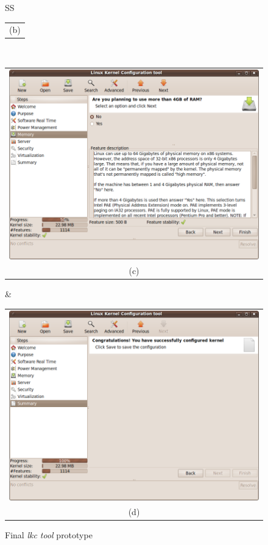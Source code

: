 \documentclass{chi2009}
\begin{document}
\begin{figure}[!t]
\begin{tabular}{SS}
\begin{tabular}{c}
  (b) \\
 \end{tabular} \\
 \begin{tabular}{c}
  \includegraphics[scale=0.25,keepaspectratio=true]{figs/lkc-final3} \\
  (c) \\
 \end{tabular}
  & 
\begin{tabular}{c}
  \includegraphics[scale=0.25,keepaspectratio=true]{figs/lkc-final4} \\
  (d) \\
 \end{tabular}
\end{tabular}
\caption{Final \textit{lkc tool} prototype}
\label{fig:lkc-final}
\end{figure}
\end{document}
